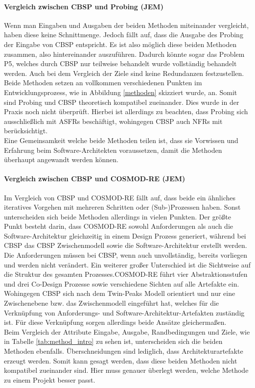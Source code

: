 \paragraph{Vergleich zwischen CBSP und Probing (JEM)}
Wenn man Eingaben und Ausgaben der beiden Methoden miteinander vergleicht, haben diese keine Schnittmenge. Jedoch f\"allt auf, dass die Ausgabe des Probing der Eingabe von CBSP entspricht. Es ist also m\"oglich diese beiden Methoden zusammen, also hintereinander auszuf\"uhren. Dadurch k\"onnte sogar das Problem P5, welches durch CBSP nur teilweise behandelt wurde vollst\"andig behandelt werden. Auch bei dem Vergleich der Ziele sind keine Redundanzen festzustellen. Beide Methoden setzen an vollkommen verschiedenen Punkten im Entwicklungsprozess, wie in Abbildung \ref{methoden} skizziert wurde, an. Somit sind Probing und CBSP theoretisch kompatibel zueinander. Dies wurde in der Praxis noch nicht \"uberpr\"uft. Hierbei ist allerdings zu beachten, dass Probing sich ausschlie\ss{}lich mit ASFRs besch\"aftigt, wohingegen CBSP auch NFRs mit ber\"ucksichtigt. \\ 

Eine Gemeinsamkeit welche beide Methoden teilen ist, dass sie Vorwissen und Erfahrung beim Software-Architekten voraussetzen, damit die Methoden \"uberhaupt angewandt werden k\"onnen. \\

\paragraph{Vergleich zwischen CBSP und COSMOD-RE (JEM)}
Im Vergleich von CBSP und COSMOD-RE f\"allt auf, dass beide ein \"ahnliches iteratives Vorgehen mit mehreren Schritten oder (Sub-)Prozessen haben. Sonst unterscheiden sich beide Methoden allerdings in vielen Punkten. Der gr\"o\ss{}te Punkt besteht darin, dass COSMOD-RE sowohl Anforderungen als auch die Software-Architektur gleichzeitig in einem Design Prozess generiert, w\"ahrend bei CBSP das CBSP Zwischenmodell sowie die Software-Architektur erstellt werden. Die Anforderungen m\"ussen bei CBSP, wenn auch unvollst\"andig, bereits vorliegen und werden nicht ver\"andert. Ein weiterer gro\ss{}er Unterschied ist die Sichtweise auf die Struktur des gesamten Prozesses.COSMOD-RE f\"uhrt vier Abstraktionsstufen und drei Co-Design Prozesse sowie verschiedene Sichten auf alle Artefakte ein. Wohingegen CBSP sich nach dem Twin-Peaks Modell orientiert und nur eine Zwischenebene bzw. das Zwischenmodell eingef\"uhrt hat, welches f\"ur die Verkn\"upfung von Anforderungs- und Software-Architektur-Artefakten zust\"andig ist. F\"ur diese Verkn\"upfung sorgen allerdings beide Ans\"atze gleicherma\ss{}en. \\
Beim Vergleich der Attribute Eingabe, Ausgabe, Randbedingungen und Ziele, wie in Tabelle \ref{tab:method_intro} zu sehen ist, unterscheiden sich die beiden Methoden ebenfalls. \"Uberschneidungen sind lediglich, dass Architekturartefakte erzeugt werden. Somit kann gesagt werden, dass diese beiden Methoden nicht kompatibel zueinander sind. Hier muss genauer \"uberlegt werden, welche Methode zu einem Projekt besser passt. \\

